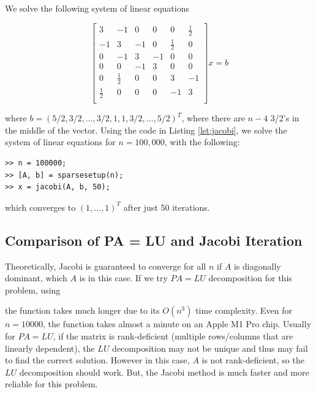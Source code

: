\documentclass[11pt]{article}
\begin{document}
We solve the following system of linear equations

\begin{equation}
\begin{bmatrix}
  3 & -1 & 0 & 0 & 0 & \frac{1}{2} \\
  -1 & 3 & -1 & 0 & \frac{1}{2} & 0 \\
  0 & -1 & 3 & -1 & 0 & 0 \\
  0 & 0 & -1 & 3 & 0 & 0 \\
  0 & \frac{1}{2} & 0 & 0 & 3 & -1 \\
  \frac{1}{2} & 0 & 0 & 0 & -1 & 3 \\
\end{bmatrix}x = b
\end{equation}

where $b = (5/2, 3/2, \dots, 3/2, 1, 1, 3/2, \dots, 5/2)^T$, where there are $n - 4$ 3/2's in the middle of the vector. Using the code in Listing \ref{lst:jacobi}, we solve the system of linear equations for $n = 100,000$, with the following:

\begin{verbatim}
>> n = 100000;
>> [A, b] = sparsesetup(n);
>> x = jacobi(A, b, 50);
\end{verbatim}

which converges to $(1, \dots, 1)^T$ after just 50 iterations.





\subsection{Comparison of PA = LU and Jacobi Iteration}

Theoretically, Jacobi is guaranteed to converge for all $n$ if $A$ is diagonally dominant, which $A$ is in this case. If we try $PA = LU$ decomposition for this problem, using



the function takes much longer due to its $O(n^3)$ time complexity. Even for $n = 10000$, the function takes almost a minute on an Apple M1 Pro chip. Usually for $PA = LU$, if the matrix is rank-deficient (multiple rows/columns that are linearly dependent), the $LU$ decomposition may not be unique and thus may fail to find the correct solution. However in this case, $A$ is not rank-deficient, so the $LU$ decomposition should work. But, the Jacobi method is much faster and more reliable for this problem.
\end{document}

